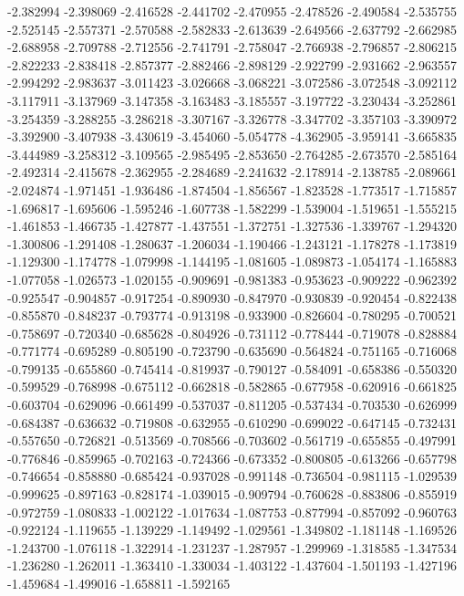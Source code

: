 -2.382994
-2.398069
-2.416528
-2.441702
-2.470955
-2.478526
-2.490584
-2.535755
-2.525145
-2.557371
-2.570588
-2.582833
-2.613639
-2.649566
-2.637792
-2.662985
-2.688958
-2.709788
-2.712556
-2.741791
-2.758047
-2.766938
-2.796857
-2.806215
-2.822233
-2.838418
-2.857377
-2.882466
-2.898129
-2.922799
-2.931662
-2.963557
-2.994292
-2.983637
-3.011423
-3.026668
-3.068221
-3.072586
-3.072548
-3.092112
-3.117911
-3.137969
-3.147358
-3.163483
-3.185557
-3.197722
-3.230434
-3.252861
-3.254359
-3.288255
-3.286218
-3.307167
-3.326778
-3.347702
-3.357103
-3.390972
-3.392900
-3.407938
-3.430619
-3.454060
-5.054778
-4.362905
-3.959141
-3.665835
-3.444989
-3.258312
-3.109565
-2.985495
-2.853650
-2.764285
-2.673570
-2.585164
-2.492314
-2.415678
-2.362955
-2.284689
-2.241632
-2.178914
-2.138785
-2.089661
-2.024874
-1.971451
-1.936486
-1.874504
-1.856567
-1.823528
-1.773517
-1.715857
-1.696817
-1.695606
-1.595246
-1.607738
-1.582299
-1.539004
-1.519651
-1.555215
-1.461853
-1.466735
-1.427877
-1.437551
-1.372751
-1.327536
-1.339767
-1.294320
-1.300806
-1.291408
-1.280637
-1.206034
-1.190466
-1.243121
-1.178278
-1.173819
-1.129300
-1.174778
-1.079998
-1.144195
-1.081605
-1.089873
-1.054174
-1.165883
-1.077058
-1.026573
-1.020155
-0.909691
-0.981383
-0.953623
-0.909222
-0.962392
-0.925547
-0.904857
-0.917254
-0.890930
-0.847970
-0.930839
-0.920454
-0.822438
-0.855870
-0.848237
-0.793774
-0.913198
-0.933900
-0.826604
-0.780295
-0.700521
-0.758697
-0.720340
-0.685628
-0.804926
-0.731112
-0.778444
-0.719078
-0.828884
-0.771774
-0.695289
-0.805190
-0.723790
-0.635690
-0.564824
-0.751165
-0.716068
-0.799135
-0.655860
-0.745414
-0.819937
-0.790127
-0.584091
-0.658386
-0.550320
-0.599529
-0.768998
-0.675112
-0.662818
-0.582865
-0.677958
-0.620916
-0.661825
-0.603704
-0.629096
-0.661499
-0.537037
-0.811205
-0.537434
-0.703530
-0.626999
-0.684387
-0.636632
-0.719808
-0.632955
-0.610290
-0.699022
-0.647145
-0.732431
-0.557650
-0.726821
-0.513569
-0.708566
-0.703602
-0.561719
-0.655855
-0.497991
-0.776846
-0.859965
-0.702163
-0.724366
-0.673352
-0.800805
-0.613266
-0.657798
-0.746654
-0.858880
-0.685424
-0.937028
-0.991148
-0.736504
-0.981115
-1.029539
-0.999625
-0.897163
-0.828174
-1.039015
-0.909794
-0.760628
-0.883806
-0.855919
-0.972759
-1.080833
-1.002122
-1.017634
-1.087753
-0.877994
-0.857092
-0.960763
-0.922124
-1.119655
-1.139229
-1.149492
-1.029561
-1.349802
-1.181148
-1.169526
-1.243700
-1.076118
-1.322914
-1.231237
-1.287957
-1.299969
-1.318585
-1.347534
-1.236280
-1.262011
-1.363410
-1.330034
-1.403122
-1.437604
-1.501193
-1.427196
-1.459684
-1.499016
-1.658811
-1.592165
